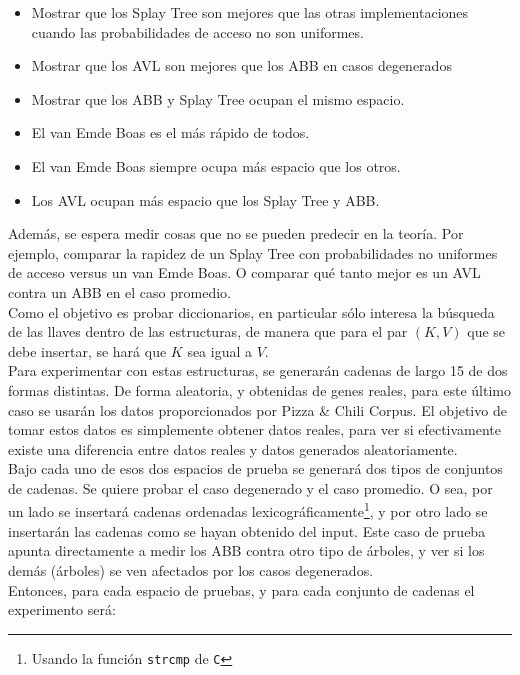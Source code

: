 \documentclass[12pt,letterpaper]{report}
\begin{document}
\begin{itemize}
\item Mostrar que los Splay Tree son mejores que las otras implementaciones cuando las probabilidades de acceso no son uniformes.
\item Mostrar que los AVL son mejores que los ABB en casos degenerados
\item Mostrar que los ABB y Splay Tree ocupan el mismo espacio.
\item El van Emde Boas es el más rápido de todos.
\item El van Emde Boas siempre ocupa más espacio que los otros.
\item Los AVL ocupan más espacio que los Splay Tree y ABB.
\end{itemize}

Además, se espera medir cosas que no se pueden predecir en la teoría. Por ejemplo, comparar la rapidez de un Splay Tree con probabilidades no uniformes de acceso versus un van Emde Boas. O comparar qué tanto mejor es un AVL contra un ABB en el caso promedio.\\

Como el objetivo es probar diccionarios, en particular sólo interesa la búsqueda de las llaves dentro de las estructuras, de manera que para el par $(K, V)$ que se debe insertar, se hará que $K$ sea igual a $V$.\\

Para experimentar con estas estructuras, se generarán cadenas de largo 15 de dos formas distintas. De forma aleatoria, y obtenidas de genes reales, para este último caso se usarán los datos proporcionados por Pizza \& Chili Corpus. El objetivo de tomar estos datos es simplemente obtener datos reales, para ver si efectivamente existe una diferencia entre datos reales y datos generados aleatoriamente.\\

Bajo cada uno de esos dos espacios de prueba se generará dos tipos de conjuntos de cadenas. Se quiere probar el caso degenerado y el caso promedio. O sea, por un lado se insertará cadenas ordenadas lexicográficamente\footnote{Usando la función \texttt{strcmp} de \texttt{C}}, y por otro lado se insertarán las cadenas como se hayan obtenido del input. Este caso de prueba apunta directamente a medir los ABB contra otro tipo de árboles, y ver si los demás (árboles) se ven afectados por los casos degenerados.\\

Entonces, para cada espacio de pruebas, y para cada conjunto de cadenas el experimento será:
\end{document}
